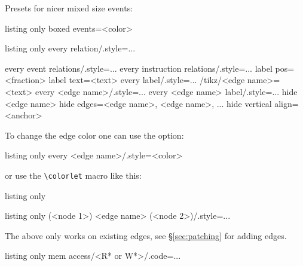 \documentclass[a4paper]{article}
\begin{document}
Presets for nicer mixed size events:
\begin{tcblisting}{listing only}
boxed events=<color> %
\end{tcblisting}

\begin{tcblisting}{listing only}
every relation/.style={...}

every event relations/.style={...}
every instruction relations/.style={...}
label pos=<fraction> %
label text=<text> %
every label/.style={...}
/tikz/<edge name>=<text> %
every <edge name>/.style={...}
every <edge name> label/.style={...}
hide <edge name>
hide edges={<edge name>, <edge name>, ...} %
hide %
vertical align=<anchor> %
\end{tcblisting}

To change the edge color one can use the option:
\begin{tcblisting}{listing only}
every <edge name>/.style={<color>}
\end{tcblisting}
or use the \lstinline[language={[LaTeX]TeX},basicstyle=\footnotesize\ttfamily]|\colorlet| macro like this:
\begin{tcblisting}{listing only}
\end{tcblisting}

\begin{tcblisting}{listing only}
(<node 1>) <edge name> (<node 2>)/.style={...}
\end{tcblisting}
The above only works on existing edges, see \S\ref{sec:patching} for adding edges.

\begin{tcblisting}{listing only}
mem access/<R* or W*>/.code={...} %
\end{tcblisting}
\end{document}
